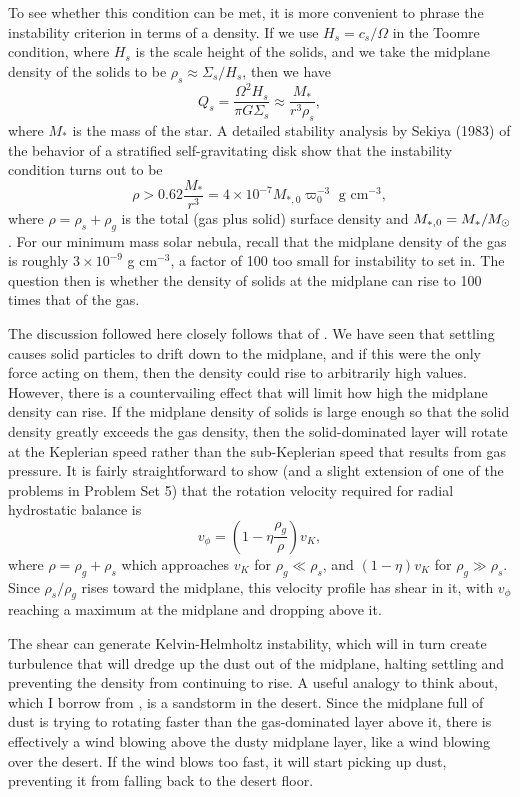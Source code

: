 To see whether this condition can be met, it is more convenient to phrase the instability criterion in terms of a density. If we use $H_s=c_s/\Omega$ in the Toomre condition, where $H_s$ is the scale height of the solids, and we take the midplane density of the solids to be $\rho_s \approx \Sigma_s/H_s$, then we have
\begin{equation}
Q_s  = \frac{\Omega^2 H_s}{\pi G \Sigma_s} \approx \frac{M_*}{r^3 \rho_s},
\end{equation}
where $M_*$ is the mass of the star. A detailed stability analysis by Sekiya (1983) of the behavior of a stratified self-gravitating disk show that the instability condition turns out to be
\begin{equation}
\rho > 0.62\frac{M_*}{r^3} = 4\times 10^{-7} M_{*,0} \varpi_0^{-3} \mbox{ g cm}^{-3},
\end{equation}
where $\rho = \rho_s + \rho_g$ is the total (gas plus solid) surface density and $M_{*,0}=M_*/M_{\odot}$. For our minimum mass solar nebula, recall that the midplane density of the gas is roughly $3\times 10^{-9}$ g cm$^{-3}$, a factor of 100 too small for instability to set in. The question then is whether the density of solids at the midplane can rise to 100 times that of the gas.

The discussion followed here closely follows that of \citet{youdin02a}. We have seen that settling causes solid particles to drift down to the midplane, and if this were the only force acting on them, then the density could rise to arbitrarily high values. However, there is a countervailing effect that will limit how high the midplane density can rise. If the midplane density of solids is large enough so that the solid density greatly exceeds the gas density, then the solid-dominated layer will rotate at the Keplerian speed rather than the sub-Keplerian speed that results from gas pressure. It is fairly straightforward to show (and a slight extension of one of the problems in Problem Set 5) that the rotation velocity required for radial hydrostatic balance is
\begin{equation}
v_{\phi} = \left(1-\eta \frac{\rho_g}{\rho}\right) v_K,
\end{equation}
where $\rho = \rho_g + \rho_s$ which approaches $v_K$ for $\rho_g \ll \rho_s$, and $(1-\eta) v_K$ for $\rho_g \gg \rho_s$. Since $\rho_s / \rho_g$ rises toward the midplane, this velocity profile has shear in it, with $v_{\phi}$ reaching a maximum at the midplane and dropping above it.

The shear can generate Kelvin-Helmholtz instability, which will in turn create turbulence that will dredge up the dust out of the midplane, halting settling and preventing the density from continuing to rise. A useful analogy to think about, which I borrow from \citet{youdin02a}, is a sandstorm in the desert. Since the midplane full of dust is trying to rotating faster than the gas-dominated layer above it, there is effectively a wind blowing above the dusty midplane layer, like a wind blowing over the desert. If the wind blows too fast, it will start picking up dust, preventing it from falling back to the desert floor.

